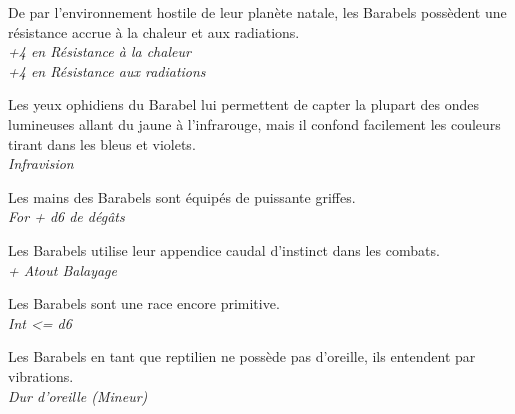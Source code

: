 \begin{description}[align=left]
\item [Enfance difficile] 	%
		De par l’environnement hostile de leur planète natale, les Barabels possèdent une résistance accrue à la chaleur et aux radiations.\\
		\textit{+4 en Résistance à la chaleur}\\
		\textit{+4 en Résistance aux radiations}
\item [\OE{il} Ophidien] 	%
		Les yeux ophidiens du Barabel lui permettent de capter la plupart des ondes lumineuses allant du jaune à l’infrarouge, mais il confond facilement les couleurs tirant dans les bleus et violets.\\
		\textit{Infravision}
\item [Arme naturelle]		%
		Les mains des Barabels sont équipés de puissante griffes.\\
		\textit{For + d6 de dégâts}
\item [Balayage]			%
		Les Barabels utilise leur appendice caudal d’instinct dans les combats.\\
		\textit{+ Atout Balayage}
\item [Primitif]			%
		Les Barabels sont une race encore primitive.\\
		\textit{Int <= d6}
\item [Dur d’oreille]		%
		Les Barabels en tant que reptilien ne possède pas d’oreille, ils entendent par vibrations.\\
		\textit{Dur d’oreille (Mineur)}
\end{description}
\newpage